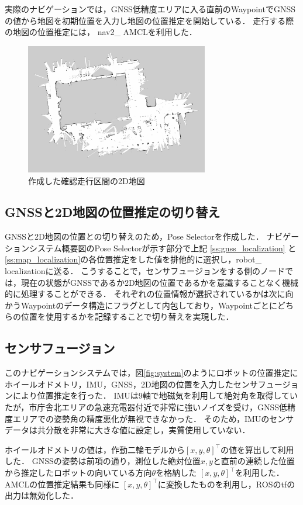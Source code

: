 \documentclass[platex,dvipdfmx]{rbproceedings}
\begin{document}
実際のナビゲーションでは，GNSS低精度エリアに入る直前のWaypointでGNSSの値から地図を初期位置を入力し地図の位置推定を開始している．
走行する際の地図の位置推定には， nav2\_ AMCL\cite{nav2}を利用した．
\begin{figure}[htbp]
    \centering   
    \includegraphics[keepaspectratio,width=80mm]{fig/map.png}
    \caption{作成した確認走行区間の2D地図}
    \label{fig:map}
\end{figure}

\subsection{GNSSと2D地図の位置推定の切り替え}
GNSSと2D地図の位置との切り替えのため，Pose Selectorを作成した．
ナビゲーションシステム概要図のPose Selectorが示す部分で上記 \ref{ss:gnss_localization} と  \ref{ss:map_localization}の各位置推定をした値を排他的に選択し，robot\_ localizationに送る．
こうすることで，センサフュージョンをする側のノードでは，現在の状態がGNSSであるか2D地図の位置であるかを意識することなく機械的に処理することができる．
それぞれの位置情報が選択されているかは次に向かうWaypointのデータ構造にフラグとして内包しており，Waypointごとにどちらの位置を使用するかを記録することで切り替えを実現した．


\subsection{センサフュージョン}\label{ss:sensor_fusion}
このナビゲーションシステムでは，図\ref{fig:system}のようにロボットの位置推定にホイールオドメトリ，IMU，GNSS，2D地図の位置を入力したセンサフュージョンにより位置推定を行った．
IMUは9軸で地磁気を利用して絶対角を取得していたが，市庁舎北エリアの急速充電器付近で非常に強いノイズを受け，GNSS低精度エリアでの姿勢角の精度悪化が無視できなかった．
そのため，IMUのセンサデータは共分散を非常に大きな値に設定し，実質使用していない．

ホイールオドメトリの値は，作動二輪モデルから$\left[ x, y, \theta \right] ^\top$の値を算出して利用した．
GNSSの姿勢は前項の通り，測位した絶対位置$x, y$と直前の連続した位置から推定したロボットの向いている方向$\theta$を格納した $\left[ x, y, \theta \right] ^\top$を利用した．
AMCLの位置推定結果も同様に $\left[ x, y, \theta \right] ^\top$に変換したものを利用し，ROSのtfの出力は無効化した．
\end{document}
